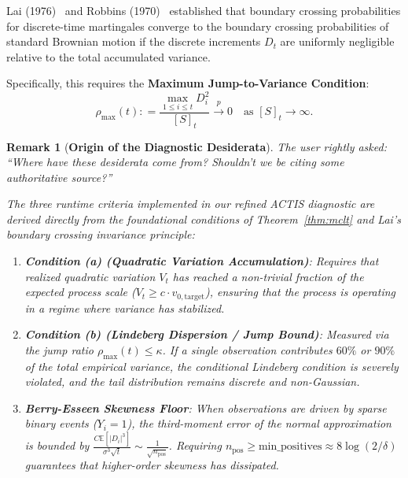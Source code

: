 \documentclass[11pt,a4paper]{article}
\newcommand{\coloneqq}{\mathrel{\mathop:}=}
\newtheorem{remark}{Remark}
\begin{document}
Lai (1976)~\cite{lai1976boundary} and Robbins (1970)~\cite{robbins1970} established that boundary crossing probabilities for discrete-time martingales converge to the boundary crossing probabilities of standard Brownian motion if the discrete increments $D_t$ are uniformly negligible relative to the total accumulated variance. 

Specifically, this requires the \textbf{Maximum Jump-to-Variance Condition}:
\begin{equation}\label{eq:max_jump_ratio}
\rho_{\max}(t) \coloneqq \frac{\max_{1 \le i \le t} D_i^2}{[S]_t} \xrightarrow{p} 0 \quad \text{as } [S]_t \to \infty.
\end{equation}

\begin{remark}[\textbf{Origin of the Diagnostic Desiderata}]\label{rem:desiderata_origin}
The user rightly asked: \emph{``Where have these desiderata come from? Shouldn't we be citing some authoritative source?''}

The three runtime criteria implemented in our refined ACTIS diagnostic are derived directly from the foundational conditions of Theorem~\ref{thm:mclt} and Lai's boundary crossing invariance principle:
\begin{enumerate}[leftmargin=*]
    \item \textbf{Condition (a) (Quadratic Variation Accumulation)}: Requires that realized quadratic variation $V_t$ has reached a non-trivial fraction of the expected process scale ($V_t \ge c \cdot v_{0, \text{target}}$), ensuring that the process is operating in a regime where variance has stabilized.
    \item \textbf{Condition (b) (Lindeberg Dispersion / Jump Bound)}: Measured via the jump ratio $\rho_{\max}(t) \le \kappa$. If a single observation contributes $60\%$ or $90\%$ of the total empirical variance, the conditional Lindeberg condition is severely violated, and the tail distribution remains discrete and non-Gaussian.
    \item \textbf{Berry-Esseen Skewness Floor}: When observations are driven by sparse binary events ($Y_i = 1$), the third-moment error of the normal approximation is bounded by $\frac{C \mathbb{E}[|D_i|^3]}{\sigma^3 \sqrt{t}} \sim \frac{1}{\sqrt{n_{\text{pos}}}}$. Requiring $n_{\text{pos}} \ge \text{min\_positives} \approx 8 \log(2/\delta)$ guarantees that higher-order skewness has dissipated.
\end{enumerate}
\end{remark}
\end{document}
